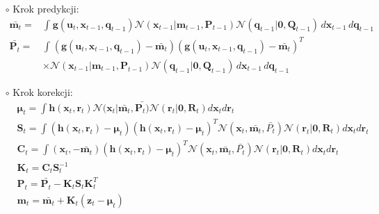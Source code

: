 \begin{itemize}
	\item[$\circ$] Krok predykcji:
	\begin{align}\label{eq:GaussianNonAdditivePredictionStep}
	\bar{\boldsymbol{m}_{t}} = &\int_{}^{}\boldsymbol{g}(\boldsymbol{u}_t, \boldsymbol{x}_{t-1}, \boldsymbol{q}_{t-1})\mathcal{N}(\boldsymbol{x}_{t-1}|\boldsymbol{m}_{t-1}, \boldsymbol{P}_{t-1}) \mathcal{N}(\boldsymbol{q}_{t-1}|\boldsymbol{0}, \boldsymbol{Q}_{t-1}) \,d\boldsymbol{x}_{t-1} \,d\boldsymbol{q}_{t-1} \nonumber \\
	\bar{\mathbf{P}_{t}} = &\int_{}^{}(\boldsymbol{g}(\boldsymbol{u}_t, \boldsymbol{x}_{t-1}, \boldsymbol{q}_{t-1}) - \bar{ \boldsymbol{m}_{t}})(\boldsymbol{g}(\boldsymbol{u}_t, \boldsymbol{x}_{t-1}, \boldsymbol{q}_{t-1}) - \bar{ \boldsymbol{m}_{t}})^T \nonumber \\ &\times \mathcal{N}(\boldsymbol{x}_{t-1}|\boldsymbol{m}_{t-1}, \boldsymbol{P}_{t-1})\mathcal{N}(\boldsymbol{q}_{t-1}|\boldsymbol{0}, \boldsymbol{Q}_{t-1}) \,d\boldsymbol{x}_{t-1} \,d\boldsymbol{q}_{t-1}
	\end{align}
	\item[$\circ$] Krok korekcji:
	\begin{align} \label{eq:GaussianNonAdditiveCorrectionStep}
	&\boldsymbol{\mu}_t=\int \boldsymbol{h}(\boldsymbol{x}_{t}, \boldsymbol{r}_t)\mathcal{N}(\boldsymbol{x}_{t}|\bar{ \boldsymbol{m}_{t}}, \bar{\boldsymbol{P}_{t})} \mathcal{N}(\boldsymbol{r}_{t}| \boldsymbol{0}, \boldsymbol{R}_{t}) d\boldsymbol{x}_{t} d\boldsymbol{r}_{t} \nonumber \\
	&\boldsymbol{S}_t=\int (\boldsymbol{h}(\boldsymbol{x}_{t}, \boldsymbol{r}_t)-\boldsymbol{\mu}_t)(\boldsymbol{h}(\boldsymbol{x}_{t}, \boldsymbol{r}_t)-\boldsymbol{\mu}_t)^T\mathcal{N}(\boldsymbol{x}_{t}, \bar{\boldsymbol{m}_{t}}, \bar{P_{t}}) \mathcal{N}(\boldsymbol{r}_{t}| \boldsymbol{0}, \boldsymbol{R}_{t}) d\boldsymbol{x}_{t} d\boldsymbol{r}_{t} \nonumber \\
	&\boldsymbol{C}_t=\int (\boldsymbol{x}_{t}, -\bar{\boldsymbol{m}_t})(\boldsymbol{h}(\boldsymbol{x}_{t}, \boldsymbol{r}_t)-\boldsymbol{\mu}_t)^T\mathcal{N}(\boldsymbol{x}_{t}, \bar{\boldsymbol{m}_{t}}, \bar{P_{t}}) \mathcal{N}(\boldsymbol{r}_{t}| \boldsymbol{0}, \boldsymbol{R}_{t}) d\boldsymbol{x}_{t} d\boldsymbol{r}_{t} \nonumber \\
	&\boldsymbol{K}_t=\boldsymbol{C}_t\boldsymbol{S}_t^{-1} \nonumber \\
	&\boldsymbol{P}_t=\bar{\mathbf{P}_{t}} - \boldsymbol{K}_t\boldsymbol{S}_t\boldsymbol{K}_t^T \nonumber \\
	&\boldsymbol{m}_t = \bar{\boldsymbol{m}_t} + \boldsymbol{K}_t(\boldsymbol{z}_t - \boldsymbol{\mu}_t)
	\end{align}
\end{itemize}
